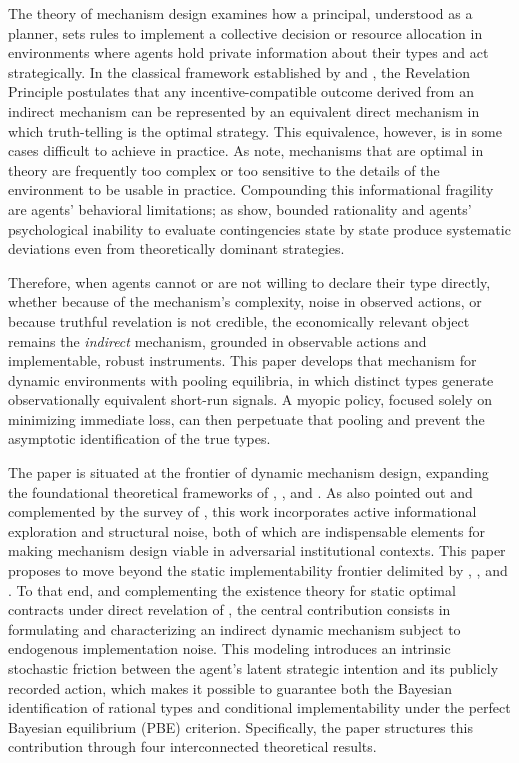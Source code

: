 \documentclass[pdflatex,sn-mathphys-ay]{sn-jnl}
\theoremstyle{plain}
\theoremstyle{definition}
\newcommand{\1}{\mathbf{1}}
\begin{document}
The theory of mechanism design examines how a principal, understood as a planner, sets rules to implement a collective decision or resource allocation in environments where agents hold private information about their types and act strategically. In the classical framework established by \citet{Gibbard1973} and \citet{Myerson1979IC,Myerson1981}, the Revelation Principle postulates that any incentive-compatible outcome derived from an indirect mechanism can be represented by an equivalent direct mechanism in which truth-telling is the optimal strategy. This equivalence, however, is in some cases difficult to achieve in practice. As \citet{BergemannMorris2012} note, mechanisms that are optimal in theory are frequently too complex or too sensitive to the details of the environment to be usable in practice. Compounding this informational fragility are agents' behavioral limitations; as \citet{ZhangLevin2017} show, bounded rationality and agents' psychological inability to evaluate contingencies state by state produce systematic deviations even from theoretically dominant strategies.

Therefore, when agents cannot or are not willing to declare their type directly, whether because of the mechanism's complexity, noise in observed actions, or because truthful revelation is not credible, the economically relevant object remains the \emph{indirect} mechanism, grounded in observable actions and implementable, robust instruments. This paper develops that mechanism for dynamic environments with pooling equilibria, in which distinct types generate observationally equivalent short-run signals. A myopic policy, focused solely on minimizing immediate loss, can then perpetuate that pooling and prevent the asymptotic identification of the true types.

The paper is situated at the frontier of dynamic mechanism design, expanding the foundational theoretical frameworks of \citet{CourtyLi2000}, \citet{EsoSzentes2007}, and \citet{PavanSegalToikka2014}. As also pointed out and complemented by the survey of \citet{BergemannValimaki2019}, this work incorporates active informational exploration and structural noise, both of which are indispensable elements for making mechanism design viable in adversarial institutional contexts. This paper proposes to move beyond the static implementability frontier delimited by \citet{MyersonSatterthwaite1983}, \citet{Rochet1987}, and \citet{RochetChone1998}. To that end, and complementing the existence theory for static optimal contracts under direct revelation of \citet{KadanRenySwinkels2017}, the central contribution consists in formulating and characterizing an indirect dynamic mechanism subject to endogenous implementation noise. This modeling introduces an intrinsic stochastic friction between the agent's latent strategic intention and its publicly recorded action, which makes it possible to guarantee both the Bayesian identification of rational types and conditional implementability under the perfect Bayesian equilibrium (PBE) criterion. Specifically, the paper structures this contribution through four interconnected theoretical results.
\end{document}
